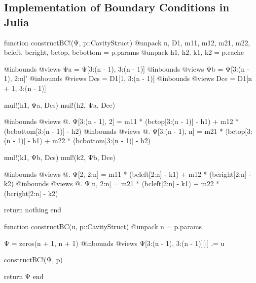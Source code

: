 
\begin{appendices}

\section{Implementation of Boundary Conditions in Julia}

\begin{jllisting}[caption={Boundary reconstruction function by filling in the outer
  two rows and columns of matrix $\Psi$, below the inplace and out of place versions
of this function \vspace{4pt}}]
function constructBC!(Ψ, p::CavityStruct)
    @unpack n, D1, m11, m12, m21, m22, bcleft, bcright, bctop, bcbottom = p.params
    @unpack h1, h2, k1, k2 = p.cache

    @inbounds @views Ψa = Ψ[3:(n - 1), 3:(n - 1)]
    @inbounds @views Ψb = Ψ[3:(n - 1), 2:n]'
    @inbounds @views Dcs = D1[1, 3:(n - 1)]
    @inbounds @views Dce = D1[n + 1, 3:(n - 1)]

    mul!(h1, Ψa, Dcs)
    mul!(h2, Ψa, Dce)

    @inbounds @views @. Ψ[3:(n - 1), 2] = m11 * (bctop[3:(n - 1)] - h1) +
                                          m12 * (bcbottom[3:(n - 1)] - h2)
    @inbounds @views @. Ψ[3:(n - 1), n] = m21 * (bctop[3:(n - 1)] - h1) +
                                          m22 * (bcbottom[3:(n - 1)] - h2)

    mul!(k1, Ψb, Dcs)
    mul!(k2, Ψb, Dce)

    @inbounds @views @. Ψ[2, 2:n] = m11 * (bcleft[2:n] - k1) + m12 * (bcright[2:n] - k2)
    @inbounds @views @. Ψ[n, 2:n] = m21 * (bcleft[2:n] - k1) + m22 * (bcright[2:n] - k2)

    return nothing
end

function constructBC(u, p::CavityStruct)
    @unpack n = p.params

    Ψ = zeros(n + 1, n + 1)
    @inbounds @views Ψ[3:(n - 1), 3:(n - 1)][:] .= u

    constructBC!(Ψ, p)

    return Ψ
end
\end{jllisting}






\end{appendices}
